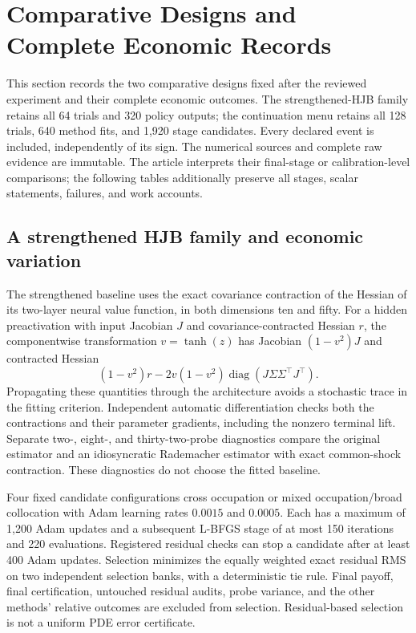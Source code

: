 \section{Comparative Designs and Complete Economic Records}\label{app:r16registered}
This section records the two comparative designs fixed after the reviewed experiment and their complete economic outcomes. The strengthened-HJB family retains all 64 trials and 320 policy outputs; the continuation menu retains all 128 trials, 640 method fits, and 1,920 stage candidates. Every declared event is included, independently of its sign. The numerical sources and complete raw evidence are immutable. The article interprets their final-stage or calibration-level comparisons; the following tables additionally preserve all stages, scalar statements, failures, and work accounts.

\subsection{A strengthened HJB family and economic variation}
The strengthened baseline uses the exact covariance contraction of the Hessian of its two-layer neural value function, in both dimensions ten and fifty. For a hidden preactivation with input Jacobian $J$ and covariance-contracted Hessian $r$, the componentwise transformation $v=\tanh(z)$ has Jacobian $(1-v^2)J$ and contracted Hessian
\[
 (1-v^2)r-2v(1-v^2)\operatorname{diag}(J\Sigma\Sigma^\top J^\top).
\]
Propagating these quantities through the architecture avoids a stochastic trace in the fitting criterion. Independent automatic differentiation checks both the contractions and their parameter gradients, including the nonzero terminal lift. Separate two-, eight-, and thirty-two-probe diagnostics compare the original estimator and an idiosyncratic Rademacher estimator with exact common-shock contraction. These diagnostics do not choose the fitted baseline.

Four fixed candidate configurations cross occupation or mixed occupation/broad collocation with Adam learning rates $0.0015$ and $0.0005$. Each has a maximum of 1,200 Adam updates and a subsequent L-BFGS stage of at most 150 iterations and 220 evaluations. Registered residual checks can stop a candidate after at least 400 Adam updates. Selection minimizes the equally weighted exact residual RMS on two independent selection banks, with a deterministic tie rule. Final payoff, final certification, untouched residual audits, probe variance, and the other methods' relative outcomes are excluded from selection. Residual-based selection is not a uniform PDE error certificate.

